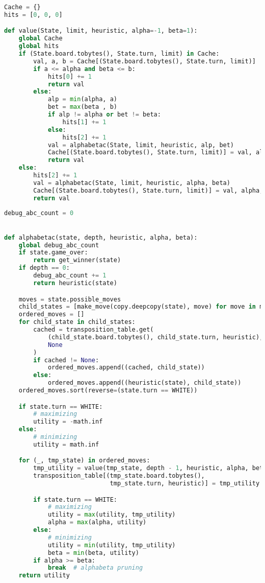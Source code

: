 \begin{lstlisting}[language=Python]
Cache = {}
hits = [0, 0, 0]

def value(State, limit, heuristic, alpha=-1, beta=1):
    global Cache
    global hits
    if (State.board.tobytes(), State.turn, limit) in Cache:
        val, a, b = Cache[(State.board.tobytes(), State.turn, limit)]
        if a <= alpha and beta <= b:
            hits[0] += 1
            return val
        else:
            alp = min(alpha, a)
            bet = max(beta , b)
            if alp != alpha or bet != beta:
                hits[1] += 1
            else:
                hits[2] += 1
            val = alphabetac(State, limit, heuristic, alp, bet)
            Cache[(State.board.tobytes(), State.turn, limit)] = val, alp, bet
            return val
    else:
        hits[2] += 1
        val = alphabetac(State, limit, heuristic, alpha, beta)
        Cache[(State.board.tobytes(), State.turn, limit)] = val, alpha, beta
        return val
\end{lstlisting}

\begin{lstlisting}[language=Python]
debug_abc_count = 0


def alphabetac(state, depth, heuristic, alpha, beta):
    global debug_abc_count
    if state.game_over:
        return get_winner(state)
    if depth == 0:
        debug_abc_count += 1
        return heuristic(state)

    moves = state.possible_moves
    child_states = [make_move(copy.deepcopy(state), move) for move in moves]
    ordered_moves = []
    for child_state in child_states:
        cached = transposition_table.get(
            (child_state.board.tobytes(), child_state.turn, heuristic),
            None
        )
        if cached != None:
            ordered_moves.append((cached, child_state))
        else:
            ordered_moves.append((heuristic(state), child_state))
    ordered_moves.sort(reverse=(state.turn == WHITE))

    if state.turn == WHITE:
        # maximizing
        utility = -math.inf
    else:
        # minimizing
        utility = math.inf

    for (_, tmp_state) in ordered_moves:
        tmp_utility = value(tmp_state, depth - 1, heuristic, alpha, beta)
        transposition_table[(tmp_state.board.tobytes(),
                             tmp_state.turn, heuristic)] = tmp_utility

        if state.turn == WHITE:
            # maximizing
            utility = max(utility, tmp_utility)
            alpha = max(alpha, utility)
        else:
            # minimizing
            utility = min(utility, tmp_utility)
            beta = min(beta, utility)
        if alpha >= beta:
            break  # alphabeta pruning
    return utility
\end{lstlisting}

